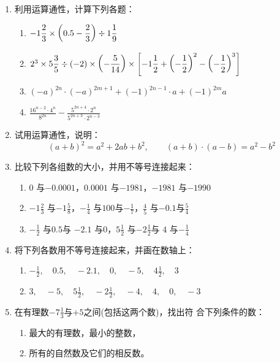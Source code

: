 \begin{enumerate}
	\item 利用运算通性，计算下列各题：
	\begin{enumerate}
		\item $-1\dfrac{2}{3}\times \left(0.5-\dfrac{2}{3}\right)\div 1\dfrac{1}{9}$
		\item $2^3\times 5\dfrac{3}{5}\div (-2)\times\left(-\dfrac{5}{14}\right)\times \left[-1\dfrac{1}{2}+\left(-\dfrac{1}{2}\right)^2-\left(-\dfrac{1}{2}\right)^3\right]$
		\item $(-a)^{2n}\cdot (-a)^{2m+1}+(-1)^{2n-1}\cdot a+(-1)^{2m}a$
		\item $\frac{16^{n-2}\cdot 4^n}{8^{2n}}-\frac{5^{2n+4}\cdot 2^n}{5^{2n+3}\cdot 2^{n-3}}$
	\end{enumerate}
	
	\item 试用运算通性，说明：
	\[(a+b)^2=a^2+2ab+b^2,\qquad (a+b)\cdot (a-b)=a^2-b^2 \]
	\item 比较下列各组数的大小，并用不等号连接起来：
	\begin{enumerate}
		\item $0$ 与$-0.0001$，\quad $0.0001$ 与$-1981$，\quad $-1981$ 与$-1990$ 
		\item $-1\frac{2}{3}$ 与$-1\frac{5}{8}$，\quad $-\frac{1}{4}$ 与$100$与$-\frac{1}{7}$，\quad $\frac{4}{5}$ 与$-0.1$与$\frac{5}{4}$
		\item  $-\frac{1}{2}$ 与$0.5$与 $-2.1$ 与$0$，\quad $5\frac{1}{2}$ 与$-2\frac{1}{2}$与 $4$ 与$-\frac{1}{4}$ 
	\end{enumerate}
	
	\item 将下列各数用不等号连接起来，并画在数轴上：
	\begin{enumerate}
		\item $-\frac{1}{2},\quad  0.5 ,\quad -2.1  ,\quad 0  ,\quad -5  ,\quad  4\frac{1}{2} ,\quad 3  $
		\item $3,\quad  -5 ,\quad 5\frac{1}{2}  ,\quad  -2\frac{1}{2} ,\quad  -4 ,\quad  4 ,\quad  0 ,\quad  -3 $
	\end{enumerate}
	
	\item  在有理数$-7\frac{1}{3}$与$+5$之间(包括这两个数)，找出符
	合下列条件的数：
	\begin{enumerate}
		\item 最大的有理数，最小的整数，
		\item 所有的自然数及它们的相反数。
	\end{enumerate}
	

\end{enumerate}
